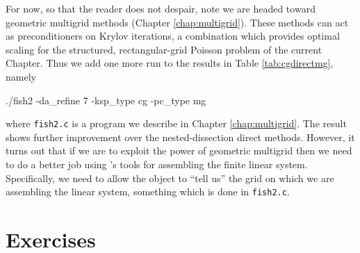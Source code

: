 For now, so that the reader does not despair, note we are headed toward geometric multigrid methods (Chapter \ref{chap:multigrid}).  These methods can act as preconditioners on Krylov iterations, a combination which provides optimal scaling for the structured, rectangular-grid Poisson problem of the current Chapter.  Thus we add one more run to the results in Table \ref{tab:cgdirectmg}, namely
\begin{cline}
./fish2 -da_refine 7 -ksp_type cg -pc_type mg
\end{cline}
where \texttt{fish2.c} is a program we describe in Chapter \ref{chap:multigrid}.  The result shows further improvement over the nested-dissection direct methods.  However, it turns out that if we are to exploit the power of geometric multigrid then we need to do a better job using \PETSc's tools for assembling the finite linear system.  Specifically, we need to allow the \pDMDA object to ``tell us'' the grid on which we are assembling the linear system, something which is done in \texttt{fish2.c}.


\section{Exercises}

